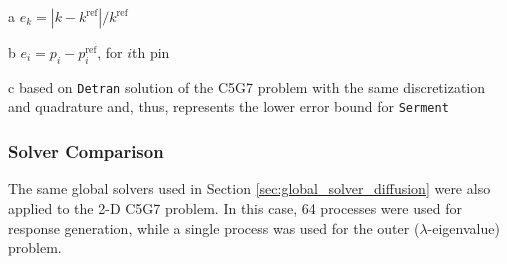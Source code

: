 \begin{table}[ht]
\begin{center}
\begin{threeparttable}
\begin{tabular}{ccrrrrrr}
 \bottomrule 
 \end{tabular}  
 {\footnotesize
 \begin{tablenotes}
   \item[a] $e_k = |k-k^{\text{ref}}|/k^{\text{ref}}$  
   \item[b] $e_i = p_i - p^{\text{ref}}_i$, for $i$th pin
   \item[c] based on {\tt Detran} solution of the C5G7 problem with the same
            discretization and quadrature and, thus, represents the lower error 
            bound for {\tt Serment} 
 \end{tablenotes}
 }
 
 \end{threeparttable}
 
 \end{center} 

\end{table} 

\subsubsection{Solver Comparison}

The same global solvers used in 
Section \ref{sec:global_solver_diffusion} were also applied 
to the 2-D C5G7 problem.  In this case, 64 processes were used 
for response generation, while a
single process was used for the outer ($\lambda$-eigenvalue) problem.

